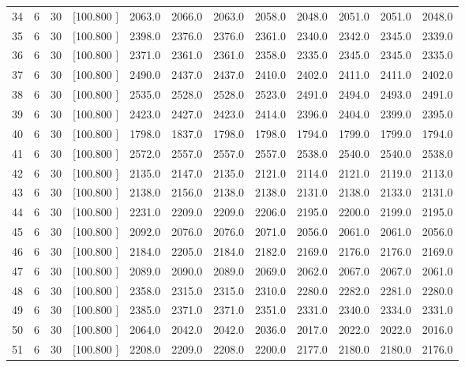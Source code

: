 \documentclass[12pt,a4paper]{article}
\begin{document}
\begin{center}
{\begin{tabular}{r r r r r r r r r r r r}
  34&  6& 30&[100.800   ]&  2063.0&  2066.0&  2063.0&  2058.0&  2048.0&  2051.0&  2051.0&  2048.0\\[-0.02in]
  35&  6& 30&[100.800   ]&  2398.0&  2376.0&  2376.0&  2361.0&  2340.0&  2342.0&  2345.0&  2339.0\\[-0.02in]
  36&  6& 30&[100.800   ]&  2371.0&  2361.0&  2361.0&  2358.0&  2335.0&  2345.0&  2345.0&  2335.0\\[-0.02in]
  37&  6& 30&[100.800   ]&  2490.0&  2437.0&  2437.0&  2410.0&  2402.0&  2411.0&  2411.0&  2402.0\\[-0.02in]
  38&  6& 30&[100.800   ]&  2535.0&  2528.0&  2528.0&  2523.0&  2491.0&  2494.0&  2493.0&  2491.0\\[-0.02in]
  39&  6& 30&[100.800   ]&  2423.0&  2427.0&  2423.0&  2414.0&  2396.0&  2404.0&  2399.0&  2395.0\\[-0.02in]
  40&  6& 30&[100.800   ]&  1798.0&  1837.0&  1798.0&  1798.0&  1794.0&  1799.0&  1799.0&  1794.0\\[-0.02in]
  41&  6& 30&[100.800   ]&  2572.0&  2557.0&  2557.0&  2557.0&  2538.0&  2540.0&  2540.0&  2538.0\\[-0.02in]
  42&  6& 30&[100.800   ]&  2135.0&  2147.0&  2135.0&  2121.0&  2114.0&  2121.0&  2119.0&  2113.0\\[-0.02in]
  43&  6& 30&[100.800   ]&  2138.0&  2156.0&  2138.0&  2138.0&  2131.0&  2138.0&  2133.0&  2131.0\\[-0.02in]
  44&  6& 30&[100.800   ]&  2231.0&  2209.0&  2209.0&  2206.0&  2195.0&  2200.0&  2199.0&  2195.0\\[-0.02in]
  45&  6& 30&[100.800   ]&  2092.0&  2076.0&  2076.0&  2071.0&  2056.0&  2061.0&  2061.0&  2056.0\\[-0.02in]
  46&  6& 30&[100.800   ]&  2184.0&  2205.0&  2184.0&  2182.0&  2169.0&  2176.0&  2176.0&  2169.0\\[-0.02in]
  47&  6& 30&[100.800   ]&  2089.0&  2090.0&  2089.0&  2069.0&  2062.0&  2067.0&  2067.0&  2061.0\\[-0.02in]
  48&  6& 30&[100.800   ]&  2358.0&  2315.0&  2315.0&  2310.0&  2280.0&  2282.0&  2281.0&  2280.0\\[-0.02in]
  49&  6& 30&[100.800   ]&  2385.0&  2371.0&  2371.0&  2351.0&  2331.0&  2340.0&  2334.0&  2331.0\\[-0.02in]
  50&  6& 30&[100.800   ]&  2064.0&  2042.0&  2042.0&  2036.0&  2017.0&  2022.0&  2022.0&  2016.0\\[-0.02in]
  51&  6& 30&[100.800   ]&  2208.0&  2209.0&  2208.0&  2200.0&  2177.0&  2180.0&  2180.0&  2176.0\\[-0.02in]

\end{tabular}}
\end{center}
\end{document}
